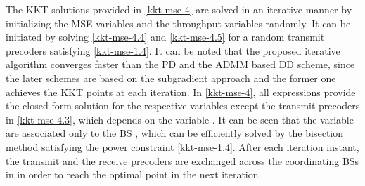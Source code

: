 The \ac{KKT} solutions provided in \eqref{kkt-mse-4} are solved in an iterative manner by initializing the \ac{MSE} variables  and the throughput variables  randomly. It can be initiated by solving \eqref{kkt-mse-4.4} and \eqref{kkt-mse-4.5} for a random transmit precoders  satisfying \eqref{kkt-mse-1.4}. It can be noted that the proposed iterative algorithm converges faster than the \acl{PD} and the \ac{ADMM} based \acl{DD} scheme, since the later schemes are based on the subgradient approach and the former one achieves the \ac{KKT} points at each iteration. In \eqref{kkt-mse-4}, all expressions provide the closed form solution for the respective variables except the transmit precoders in \eqref{kkt-mse-4.3}, which depends on the variable . It can be seen that the variable  are associated only to the \ac{BS} , which can be efficiently solved by the bisection method satisfying the power constraint \eqref{kkt-mse-1.4}. After each iteration instant, the transmit and the receive precoders are exchanged across the coordinating \acp{BS} in  in order to reach the optimal point in the next iteration.

